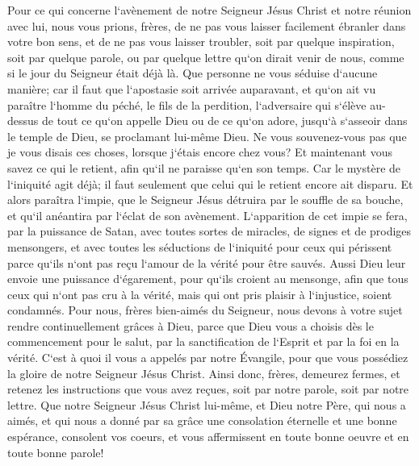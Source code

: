 \verse Pour ce qui concerne l`avènement de notre Seigneur Jésus Christ et notre réunion avec lui, nous vous prions, frères, 
\verse de ne pas vous laisser facilement ébranler dans votre bon sens, et de ne pas vous laisser troubler, soit par quelque inspiration, soit par quelque parole, ou par quelque lettre qu`on dirait venir de nous, comme si le jour du Seigneur était déjà là. 
\verse Que personne ne vous séduise d`aucune manière; car il faut que l`apostasie soit arrivée auparavant, et qu`on ait vu paraître l`homme du péché, le fils de la perdition, 
\verse l`adversaire qui s`élève au-dessus de tout ce qu`on appelle Dieu ou de ce qu`on adore, jusqu`à s`asseoir dans le temple de Dieu, se proclamant lui-même Dieu. 
\verse Ne vous souvenez-vous pas que je vous disais ces choses, lorsque j`étais encore chez vous? 
\verse Et maintenant vous savez ce qui le retient, afin qu`il ne paraisse qu`en son temps. 
\verse Car le mystère de l`iniquité agit déjà; il faut seulement que celui qui le retient encore ait disparu. 
\verse Et alors paraîtra l`impie, que le Seigneur Jésus détruira par le souffle de sa bouche, et qu`il anéantira par l`éclat de son avènement. 
\verse L`apparition de cet impie se fera, par la puissance de Satan, avec toutes sortes de miracles, de signes et de prodiges mensongers, 
\verse et avec toutes les séductions de l`iniquité pour ceux qui périssent parce qu`ils n`ont pas reçu l`amour de la vérité pour être sauvés. 
\verse Aussi Dieu leur envoie une puissance d`égarement, pour qu`ils croient au mensonge, 
\verse afin que tous ceux qui n`ont pas cru à la vérité, mais qui ont pris plaisir à l`injustice, soient condamnés. 
\verse Pour nous, frères bien-aimés du Seigneur, nous devons à votre sujet rendre continuellement grâces à Dieu, parce que Dieu vous a choisis dès le commencement pour le salut, par la sanctification de l`Esprit et par la foi en la vérité. 
\verse C`est à quoi il vous a appelés par notre Évangile, pour que vous possédiez la gloire de notre Seigneur Jésus Christ. 
\verse Ainsi donc, frères, demeurez fermes, et retenez les instructions que vous avez reçues, soit par notre parole, soit par notre lettre. 
\verse Que notre Seigneur Jésus Christ lui-même, et Dieu notre Père, qui nous a aimés, et qui nous a donné par sa grâce une consolation éternelle et une bonne espérance, 
\verse consolent vos coeurs, et vous affermissent en toute bonne oeuvre et en toute bonne parole! 

\chapter{}

